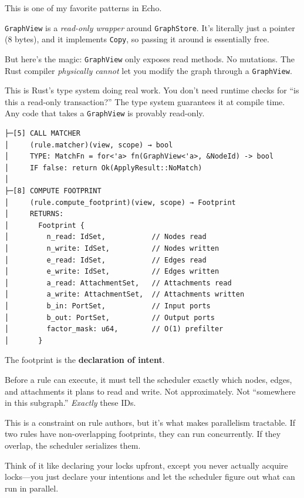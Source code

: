 \documentclass[11pt]{book}
\newenvironment{directors}
{\begin{mdframed}[
  linecolor=blue!60,
  linewidth=2pt,
  leftline=true,
  rightline=false,
  topline=false,
  bottomline=false,
  backgroundcolor=blue!3,
  innerleftmargin=12pt,
  innerrightmargin=10pt,
  innertopmargin=8pt,
  innerbottommargin=8pt,
  skipabove=12pt,
  skipbelow=12pt
]\small\sffamily\color{blue!70!black}}
{\end{mdframed}}
\begin{document}
\begin{directors}
This is one of my favorite patterns in Echo.

\texttt{GraphView} is a \emph{read-only wrapper} around \texttt{GraphStore}. It's literally just a pointer (8 bytes), and it implements \texttt{Copy}, so passing it around is essentially free.

But here's the magic: \texttt{GraphView} only exposes read methods. No mutations. The Rust compiler \emph{physically cannot} let you modify the graph through a \texttt{GraphView}.

This is Rust's type system doing real work. You don't need runtime checks for ``is this a read-only transaction?'' The type system guarantees it at compile time. Any code that takes a \texttt{GraphView} is provably read-only.
\end{directors}

\begin{verbatim}
├─[5] CALL MATCHER
│     (rule.matcher)(view, scope) → bool
│     TYPE: MatchFn = for<'a> fn(GraphView<'a>, &NodeId) -> bool
│     IF false: return Ok(ApplyResult::NoMatch)
│
├─[8] COMPUTE FOOTPRINT
│     (rule.compute_footprint)(view, scope) → Footprint
│     RETURNS:
│       Footprint {
│         n_read: IdSet,           // Nodes read
│         n_write: IdSet,          // Nodes written
│         e_read: IdSet,           // Edges read
│         e_write: IdSet,          // Edges written
│         a_read: AttachmentSet,   // Attachments read
│         a_write: AttachmentSet,  // Attachments written
│         b_in: PortSet,           // Input ports
│         b_out: PortSet,          // Output ports
│         factor_mask: u64,        // O(1) prefilter
│       }
\end{verbatim}

\begin{directors}
The footprint is the \textbf{declaration of intent}.

Before a rule can execute, it must tell the scheduler exactly which nodes, edges, and attachments it plans to read and write. Not approximately. Not ``somewhere in this subgraph.'' \emph{Exactly} these IDs.

This is a constraint on rule authors, but it's what makes parallelism tractable. If two rules have non-overlapping footprints, they can run concurrently. If they overlap, the scheduler serializes them.

Think of it like declaring your locks upfront, except you never actually acquire locks---you just declare your intentions and let the scheduler figure out what can run in parallel.
\end{directors}
\end{document}
